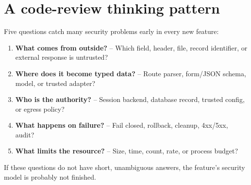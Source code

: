 \section{A code-review thinking pattern}

Five questions catch many security problems early in every new feature:

\begin{enumerate}
  \item \textbf{What comes from outside?} -- Which field, header, file, record identifier, or external response is untrusted?
  \item \textbf{Where does it become typed data?} -- Route parser, form/JSON schema, model, or trusted adapter?
  \item \textbf{Who is the authority?} -- Session backend, database record, trusted config, or egress policy?
  \item \textbf{What happens on failure?} -- Fail closed, rollback, cleanup, 4xx/5xx, audit?
  \item \textbf{What limits the resource?} -- Size, time, count, rate, or process budget?
\end{enumerate}

If these questions do not have short, unambiguous answers, the feature's security model is probably not finished.
